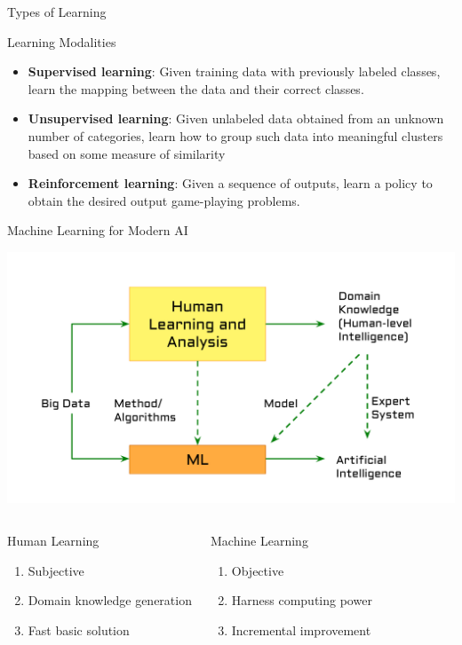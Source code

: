 \documentclass[aspectratio=169,xcolor=dvipsnames,svgnames,x11names,fleqn]{beamer}
\begin{document}
\begin{frame}{Types of Learning}
\begin{tblock}{Learning Modalities}
    
\begin{itemize}
    \item<2-> {\bf\color{DarkBlue} Supervised learning}: Given training data with previously labeled classes, learn the mapping between the data and their correct classes. 
    \item<3-> {\bf\color{DarkBlue} Unsupervised learning}: Given unlabeled data obtained from an unknown number of categories, learn how to group such data into meaningful clusters based on some measure of similarity
    \item<4-> {\bf\color{DarkBlue} Reinforcement learning}: Given a sequence of outputs, learn a policy to obtain the desired output game-playing problems.
\end{itemize}
\end{tblock}

\end{frame}

\begin{frame}{Machine Learning for Modern AI}
     \begin{center}
    \includegraphics[width=0.42\linewidth,trim=1cm 1.5cm 1cm 1.5cm,clip]{figures/ModernAI.pdf}
  \end{center}
  \begin{columns}
    \begin{redblock}{Human Learning}
        \begin{enumerate}
            \item Subjective
            \item Domain knowledge generation
            \item Fast basic solution
        \end{enumerate}
    \end{redblock}

    \begin{redblock}{Machine Learning}
      \begin{enumerate}
            \item Objective
            \item Harness computing power
            \item Incremental improvement
        \end{enumerate}
    \end{redblock}
\end{columns}
\end{frame}
\end{document}
